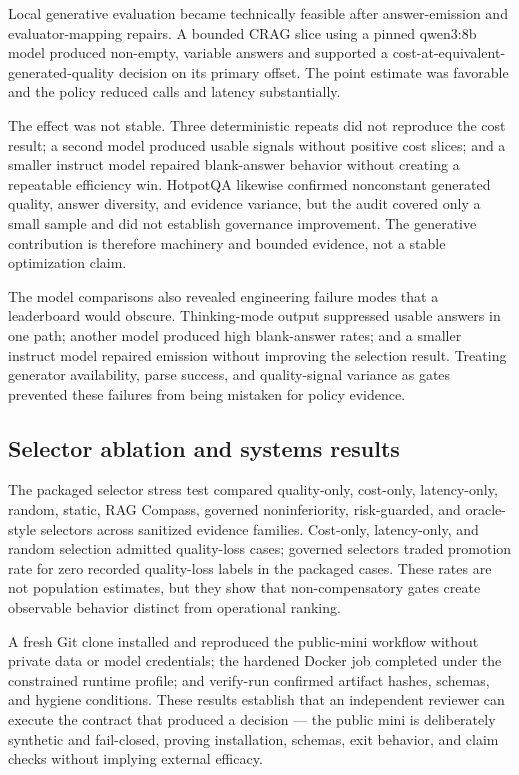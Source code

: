 \documentclass[11pt]{article}
\begin{document}
Local generative evaluation became technically feasible after
answer-emission and evaluator-mapping repairs. A bounded CRAG slice
using a pinned qwen3:8b model produced non-empty, variable answers and
supported a cost-at-equivalent-generated-quality decision on its primary
offset. The point estimate was favorable and the policy reduced calls
and latency substantially.

The effect was not stable. Three deterministic repeats did not reproduce
the cost result; a second model produced usable signals without positive
cost slices; and a smaller instruct model repaired blank-answer behavior
without creating a repeatable efficiency win. HotpotQA likewise
confirmed nonconstant generated quality, answer diversity, and evidence
variance, but the audit covered only a small sample and did not
establish governance improvement. The generative contribution is
therefore machinery and bounded evidence, not a stable optimization
claim.

The model comparisons also revealed engineering failure modes that a
leaderboard would obscure. Thinking-mode output suppressed usable
answers in one path; another model produced high blank-answer rates; and
a smaller instruct model repaired emission without improving the
selection result. Treating generator availability, parse success, and
quality-signal variance as gates prevented these failures from being
mistaken for policy evidence.

\subsection{Selector ablation and systems results}\label{sec:selector-ablation}

The packaged selector stress test compared quality-only, cost-only,
latency-only, random, static, RAG Compass, governed noninferiority,
risk-guarded, and oracle-style selectors across sanitized evidence
families. Cost-only, latency-only, and random selection admitted
quality-loss cases; governed selectors traded promotion rate for zero
recorded quality-loss labels in the packaged cases. These rates are not
population estimates, but they show that non-compensatory gates create
observable behavior distinct from operational ranking.

A fresh Git clone installed and reproduced the public-mini workflow
without private data or model credentials; the hardened Docker job
completed under the constrained runtime profile; and verify-run
confirmed artifact hashes, schemas, and hygiene conditions. These
results establish that an independent reviewer can execute the contract
that produced a decision --- the public mini is deliberately synthetic
and fail-closed, proving installation, schemas, exit behavior, and claim
checks without implying external efficacy.
\end{document}
